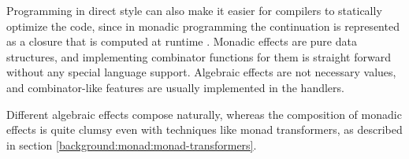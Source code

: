 Programming in direct style can also make it easier for compilers to statically optimize the code, since in monadic programming the continuation is represented as a closure that is computed at runtime . Monadic effects are pure data structures, and implementing combinator functions for them is straight forward without any special language support. Algebraic effects are not necessary values, and combinator-like features are usually implemented in the handlers.

Different algebraic effects compose naturally, whereas the composition of monadic effects is quite clumsy even with techniques like monad transformers, as described in section \ref{background:monad:monad-transformers}. 

